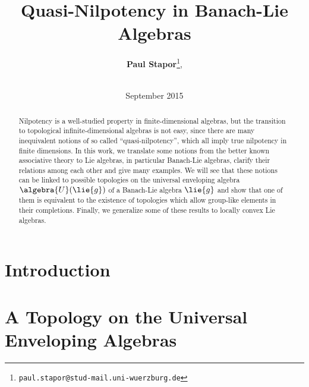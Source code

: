 \documentclass[
11pt,                          %
english                        %
]{article}
\title{Quasi-Nilpotency in Banach-Lie Algebras}
\author{
  \textbf{Paul Stapor}\thanks{\texttt{paul.stapor@stud-mail.uni-wuerzburg.de}},
  \addtocounter{footnote}{2}
  \\[0.5cm]
  \chairXaddress
}
\date{September 2015}
\begin{document}
%
%

\maketitle

%
%

\begin{abstract}
    Nilpotency is a well-studied property in finite-dimensional algebras, but the 
    transition to topological infinite-dimensional algebras is not easy, since there 
    are many inequivalent notions of so called ``quasi-nilpotency'', which all imply 
    true nilpotency in finite dimensions. In this work, we translate some notions 
    from the better known associative theory to Lie algebras, in particular 
    Banach-Lie algebras, clarify their relations among each other and give many 
    examples. We will see that these notions can be linked to possible topologies on 
    the universal enveloping algebra $\algebra{U}(\lie{g})$ of a Banach-Lie algebra 
    $\lie{g}$ and show that one of them is equivalent to the existence of 
    topologies which allow group-like elements in their completions. Finally, we 
    generalize some of these results to locally convex Lie algebras.
\end{abstract}

\newpage


%
%

\tableofcontents
\newpage


%
%

\section{Introduction}
\label{sec:Introduction}



\section{A Topology on the Universal Enveloping Algebras}
\end{document}
